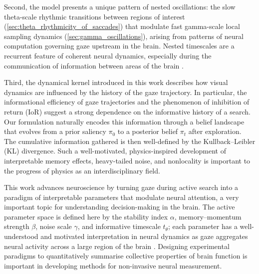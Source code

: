 Second, the model presents a unique pattern of nested oscillations: the slow theta-scale rhythmic transitions between regions of interest (\cref{sec:theta_rhythmicity_of_saccades}) that modulate fast gamma-scale local sampling dynamics (\cref{sec:gamma_oscillations}), arising from patterns of neural computation governing gaze upstream in the brain. Nested timescales are a recurrent feature of coherent neural dynamics, especially during the communication of information between areas of the brain \cite{tan_theta_2024, spyropoulos_theta_2018, fries_mechanism_2005, bastos_communication_2015, fries_rhythms_2015, fries_rhythmic_2023}.

Third, the dynamical kernel introduced in this work describes how visual dynamics are influenced by the history of the gaze trajectory. In particular, the informational efficiency of gaze trajectories and the phenomenon of inhibition of return (IoR) suggest a strong dependence on the informative history of a search. Our formulation naturally encodes this information through a belief landscape that evolves from a prior saliency $\pi_0$ to a posterior belief $\pi_t$ after exploration. The cumulative information gathered is then well-defined by the Kullback--Leibler (KL) divergence. Such a well-motivated, physics-inspired development of interpretable memory effects, heavy-tailed noise, and nonlocality is important to the progress of physics as an interdisciplinary field.

This work advances neuroscience by turning gaze during active search into a paradigm of interpretable parameters that modulate neural attention, a very important topic for understanding decision-making in the brain. The active parameter space is defined here by the stability index $\alpha$, memory--momentum strength $\beta$, noise scale $\gamma$, and informative timescale $t_{\theta}$; each parameter has a well-understood and motivated interpretation in neural dynamics as gaze aggregates neural activity across a large region of the brain \cite{ZHAOPING2026103211}. Designing experimental paradigms to quantitatively summarise collective properties of brain function is important in developing methods for non-invasive neural measurement.

